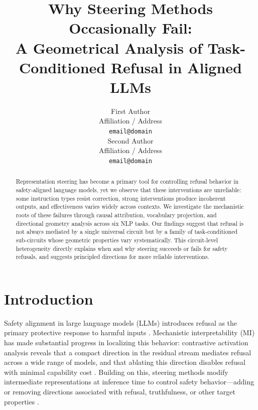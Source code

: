 \documentclass[11pt]{article}
\title{Why Steering Methods Occasionally Fail:\\
A Geometrical Analysis of Task-Conditioned Refusal in Aligned LLMs}
\author{First Author \\
  Affiliation / Address \\
  \texttt{email@domain} \\\And
  Second Author \\
  Affiliation / Address \\
  \texttt{email@domain} \\}
\begin{document}
\maketitle

\begin{abstract}

Representation steering has become a primary tool for controlling refusal behavior in safety-aligned language models, yet we observe that these interventions are unreliable: some instruction types resist correction, strong interventions produce incoherent outputs, and effectiveness varies widely across contexts. We investigate the mechanistic roots of these failures through causal attribution, vocabulary projection, and directional geometry analysis across six NLP tasks. Our findings suggest that refusal is not always mediated by a single universal circuit but by a family of task-conditioned sub-circuits whose geometric properties vary systematically. This circuit-level heterogeneity directly explains when and why steering succeeds or fails for safety refusals, and suggests principled directions for more reliable interventions.

\end{abstract}

\section{Introduction}

Safety alignment in large language models (LLMs) introduces refusal as the primary protective response to harmful inputs \citep{ouyang2022instructgpt,bai2022constitutional}. Mechanistic interpretability (MI) has made substantial progress in localizing this behavior: contrastive activation analysis reveals that a compact direction in the residual stream mediates refusal across a wide range of models, and that ablating this direction disables refusal with minimal capability cost \citep{arditi2024refusal,zhao2025refusal}. Building on this, steering methods modify intermediate representations at inference time to control safety behavior---adding or removing directions associated with refusal, truthfulness, or other target properties \citep{zou2023representation,panickssery2023steering,wangf2025refusal}.
\end{document}
